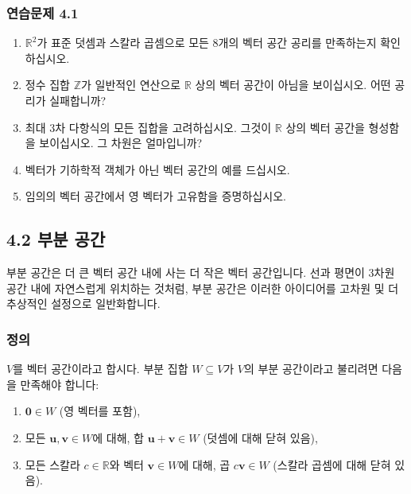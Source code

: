 \documentclass[
  12pt,
  a4paper,
]{article}
\begin{document}
\subsubsection{연습문제 4.1}\label{exercises-41}

\begin{enumerate}
\def\labelenumi{\arabic{enumi}.}
\item
  \(\mathbb{R}^2\)가 표준 덧셈과 스칼라 곱셈으로 모든 8개의 벡터 공간 공리를 만족하는지 확인하십시오.
\item
  정수 집합 \(\mathbb{Z}\)가 일반적인 연산으로 \(\mathbb{R}\) 상의 벡터 공간이 아님을 보이십시오. 어떤 공리가 실패합니까?
\item
  최대 3차 다항식의 모든 집합을 고려하십시오. 그것이 \(\mathbb{R}\) 상의 벡터 공간을 형성함을 보이십시오. 그 차원은 얼마입니까?
\item
  벡터가 기하학적 객체가 아닌 벡터 공간의 예를 드십시오.
\item
  임의의 벡터 공간에서 영 벡터가 고유함을 증명하십시오.
\end{enumerate}

\subsection{4.2 부분 공간}\label{42-subspaces}

부분 공간은 더 큰 벡터 공간 내에 사는 더 작은 벡터 공간입니다. 선과 평면이 3차원 공간 내에 자연스럽게 위치하는 것처럼, 부분 공간은 이러한 아이디어를 고차원 및 더 추상적인 설정으로 일반화합니다.

\subsubsection{정의}\label{definition-2}

\(V\)를 벡터 공간이라고 합시다. 부분 집합 \(W \subseteq V\)가 \(V\)의 부분 공간이라고 불리려면 다음을 만족해야 합니다:

\begin{enumerate}
\def\labelenumi{\arabic{enumi}.}
\item
  \(\mathbf{0} \in W\) (영 벡터를 포함),
\item
  모든 \(\mathbf{u}, \mathbf{v} \in W\)에 대해, 합 \(\mathbf{u} + \mathbf{v} \in W\) (덧셈에 대해 닫혀 있음),
\item
  모든 스칼라 \(c \in \mathbb{R}\)와 벡터 \(\mathbf{v} \in W\)에 대해, 곱 \(c\mathbf{v} \in W\) (스칼라 곱셈에 대해 닫혀 있음).
\end{enumerate}
\end{document}
